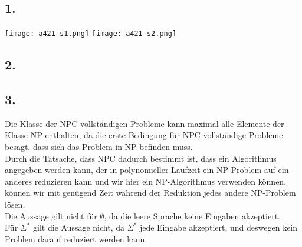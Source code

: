 \subsection*{1.}
\texttt{[image: a421-s1.png]}
\texttt{[image: a421-s2.png]}

\subsection*{2.}

\subsection*{3.}
Die Klasse der NPC-vollständigen Probleme kann maximal alle Elemente der Klasse NP enthalten, da die erste Bedingung für NPC-vollständige Probleme besagt, dass sich das Problem in NP befinden muss.\\
Durch die Tatsache, dass NPC dadurch bestimmt ist, dass ein Algorithmus angegeben werden kann, der in polynomieller Laufzeit ein NP-Problem auf ein anderes reduzieren kann und wir hier ein NP-Algorithmus verwenden können, können wir mit genügend Zeit während der Reduktion jedes andere NP-Problem lösen.\\
Die Aussage gilt nicht für $\emptyset$, da die leere Sprache keine Eingaben akzeptiert.\\
Für $\Sigma^*$ gilt die Aussage nicht, da $\Sigma^*$ jede Eingabe akzeptiert, und deswegen kein Problem darauf reduziert werden kann.